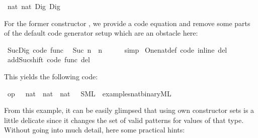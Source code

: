 \begin{isabellebody}
\ {\isachardoublequoteopen}{}{\isasymColon}nat{\isachardoublequoteclose}\ {\isachardoublequoteopen}{}{\isasymColon}nat{\isachardoublequoteclose}\ Dig{}\ Dig{}%
\begin{isamarkuptext}%
\noindent For the former constructor , we provide a code
  equation and remove some parts of the default code generator setup
  which are an obstacle here:%
\end{isamarkuptext}%
\isamarkuptrue%
\isamarkupfalse%
\ Suc{\isacharunderscore}Dig\ {\isacharbrackleft}code\ func{\isacharbrackright}{\isacharcolon}\isanewline
\ \ {\isachardoublequoteopen}Suc\ n\ {\isacharequal}\ n\ {\isacharplus}\ {}{\isachardoublequoteclose}\isanewline
%
\isadelimproof
\ \ %
\endisadelimproof
%
\isatagproof
{}\isamarkupfalse%
\ simp%
\endisatagproof
{\isafoldproof}%
%
\isadelimproof
\isanewline
%
\endisadelimproof
\isanewline
{}\isamarkupfalse%
\ One{\isacharunderscore}nat{\isacharunderscore}def\ {\isacharbrackleft}code\ inline\ del{\isacharbrackright}\isanewline
{}\isamarkupfalse%
\ add{\isacharunderscore}Suc{\isacharunderscore}shift\ {\isacharbrackleft}code\ func\ del{\isacharbrackright}%
\begin{isamarkuptext}%
\noindent This yields the following code:%
\end{isamarkuptext}%
\isamarkuptrue%
\isamarkupfalse%
\ {\isachardoublequoteopen}op\ {\isacharplus}\ {\isasymColon}\ nat\ {\isasymRightarrow}\ nat\ {\isasymRightarrow}\ nat{\isachardoublequoteclose}\ \ \ SML\ \ {\isachardoublequoteopen}examples{\isacharslash}nat{\isacharunderscore}binary{\isachardot}ML{\isachardoublequoteclose}%
\begin{isamarkuptext}%
%
\end{isamarkuptext}%
\isamarkuptrue%
%
\begin{isamarkuptext}%
\medskip

  From this example, it can be easily glimpsed that using own constructor sets
  is a little delicate since it changes the set of valid patterns for values
  of that type.  Without going into much detail, here some practical hints:


\end{isamarkuptext}
\end{isabellebody}

